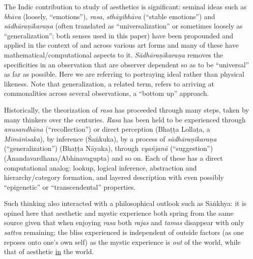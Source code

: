 The Indic contribution to study of aesthetics is significant: seminal ideas such as \textsl{bhāva} (loosely, “emotions”), \textsl{rasa},
 \textsl{sthāyibhāva} (“stable emotions”) and \textsl{sādhāraṇīkaraṇa} (often translated as “universalization” or sometimes loosely as “generalization”; both senses used in this paper) have been propounded and applied in the context of and across various art forms and many of these have mathematical/computational aspects to it. \textsl{Sādhāraṇīkaraṇa} removes the specificities in an observation that are observer dependent so as to be “universal” as far as possible. Here we are referring to portraying ideal rather than physical likeness. Note that generalization, a related term, refers to arriving at commonalities across several observations, a “bottom up” approach.

Historically, the theorization of \textsl{rasa} has proceeded through many steps, taken by many thinkers over the centuries. \textsl{Rasa} has been held to be experienced through \textsl{anusandhāna} (“recollection”) or direct perception (Bhaṭṭa Lollaṭa, a \textsl{Mīmāṁsaka}), by inference (Śaṅkuka), by a process of \textsl{sādhāraṇīkaraṇa} (“generalization”) (Bhaṭṭa Nāyaka), through \textsl{vyañjanā} (“suggestion”) (Ānandavardhana/Abhinavagupta) and so on. Each of these has a direct computational analog: lookup, logical inference, abstraction and hierarchy/category formation, and layered description with even possibly “epigenetic” or “transcendental” properties.

Such thinking also interacted with a philosophical outlook such as Sāṅkhya: it is opined here that aesthetic and mystic experience both spring from the same source given that when enjoying \textsl{rasa} both \textsl{rajas} and \textsl{tamas} disappear with only \textsl{sattva} remaining; the bliss experienced is independent of outside factors (as one reposes onto one’s own self) as the mystic experience is \textsl{out} of the world, while that of aesthetic \underline{in} the world.


